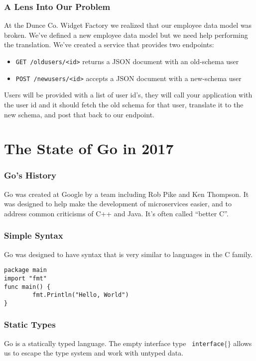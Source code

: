 \documentclass{beamer}
\begin{document}
\begin{frame}[fragile]
  \frametitle{A Lens Into Our Problem}
  At the Dunce Co. Widget Factory we realized that our employee data
  model was broken.  We've defined a new employee data model but we
  need help performing the translation. We've created a service that
  provides two endpoints:\\
  \vfill
  \begin{itemize}
  \item {\tt GET /oldusers/<id>} returns a JSON document with an old-schema user
  \item {\tt POST /newusers/<id>} accepts a JSON document with a new-schema user
  \end{itemize}
  \vfill
  Users will be provided with a list of user id's, they will call your
  application with the user id and it should fetch the old schema for
  that user, translate it to the new schema, and post that back to our
  endpoint.
\end{frame}

\section{The State of Go in 2017}
\begin{frame}
  \frametitle{Go's History}

  Go was created at Google by a team including Rob Pike and Ken
  Thompson.  It was designed to help make the development of
  microservices easier, and to address common criticisms of C++ and
  Java.  It's often called ``better C''.
\end{frame}

\begin{frame} [fragile]
  \frametitle{Simple Syntax}

  Go was designed to have syntax that is very similar to languages in
  the C family.
\\\vfill
\begin{lstlisting}[language=Golang]
package main
import "fmt"
func main() {
        fmt.Println("Hello, World")
}
\end{lstlisting}
\end{frame}

\begin{frame}
  \frametitle{Static Types}
  Go is a statically typed language.  The empty interface type {\tt
    interface$\{\}$} allows us to escape the type system and work
  with untyped data.
\end{frame}
\end{document}
